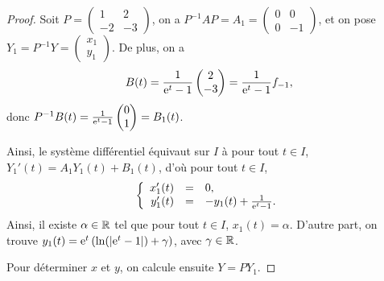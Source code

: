 \documentclass[12pt]{article}
\begin{document}
\begin{proof}
	Soit $P=\begin{pmatrix}
		1&2\\
		-2&-3
	\end{pmatrix}$, on a $P^{-1}AP=A_1=\begin{pmatrix}
		0&0\\
		0&-1
	\end{pmatrix}$, et on pose $Y_1=P^{-1}Y=\begin{pmatrix}
		x_1\\y_1
	\end{pmatrix}$. De plus, on a 
	\begin{equation}
		B(t)=\frac{1}{\mathrm{e}^{t}-1}\begin{pmatrix}
			2\\-3
		\end{pmatrix}=\frac{1}{\mathrm{e}^{t}-1}f_{-1},
	\end{equation}
	donc $P^{-1}B(t)=\frac{1}{\mathrm{e}^{t}-1}\begin{pmatrix}
		0\\1
	\end{pmatrix}=B_1(t)$.

	Ainsi, le système différentiel équivaut sur $I$ à pour tout $t\in I$, $Y_1'(t)=A_1 Y_1(t)+B_1(t)$, d'où pour tout $t\in I$,
	\begin{equation}
		\left\lbrace
			\begin{array}[]{rcl}
				x_1'(t)&=&0,\\
				y_1'(t)&=&-y_1(t)+\frac{1}{\e^{t}-1}.
			\end{array}
		\right.
	\end{equation}
	Ainsi, il existe $\alpha\in\mathbb{R}$ tel que pour tout $t\in I$, $x_1(t)=\alpha$. D'autre part, on trouve $y_1(t)=\mathrm{e}^{t}\left(\ln(\left\lvert\mathrm{e}^{t}-1\right\rvert)+\gamma\right)$, avec $\gamma\in\mathbb{R}$.

	Pour déterminer $x$ et $y$, on calcule ensuite $Y=PY_{1}$.
\end{proof}
\end{document}
